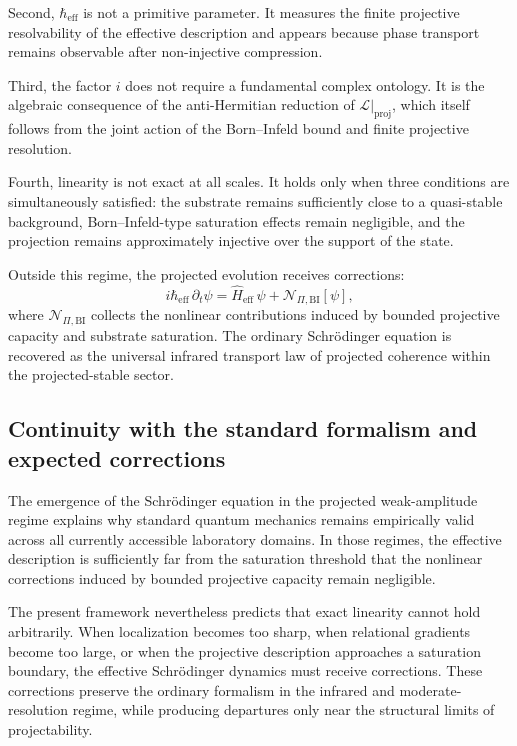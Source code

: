     Second, $\hbar_{\mathrm{eff}}$ is not a primitive parameter.
    It measures the finite projective resolvability of the effective description and appears
    because phase transport remains observable after non-injective compression.

    Third, the factor $i$ does not require a fundamental complex ontology.
    It is the algebraic consequence of the anti-Hermitian reduction of
    $\mathcal{L}|_{\mathrm{proj}}$, which itself follows from the joint action of the
    Born--Infeld bound and finite projective resolution.

    Fourth, linearity is not exact at all scales.
    It holds only when three conditions are simultaneously satisfied:
    the substrate remains sufficiently close to a quasi-stable background,
    Born--Infeld-type saturation effects remain negligible, and the projection remains
    approximately injective over the support of the state.

    Outside this regime, the projected evolution receives corrections:
    \[
      i\hbar_{\mathrm{eff}}\,\partial_t \psi
      = \hat{H}_{\mathrm{eff}}\,\psi
      + \mathcal{N}_{\Pi,\mathrm{BI}}[\psi],
    \]
    where $\mathcal{N}_{\Pi,\mathrm{BI}}$ collects the nonlinear contributions induced by bounded
    projective capacity and substrate saturation.
    The ordinary Schr\"{o}dinger equation is recovered as the universal infrared transport law
    of projected coherence within the projected-stable sector.

\subsection{Continuity with the standard formalism and expected corrections}
\label{subsec:schrodinger-corrections}

The emergence of the Schr\"{o}dinger equation in the projected weak-amplitude regime
explains why standard quantum mechanics remains empirically valid across all currently
accessible laboratory domains.
In those regimes, the effective description is sufficiently far from the saturation threshold
that the nonlinear corrections induced by bounded projective capacity remain negligible.

The present framework nevertheless predicts that exact linearity cannot hold arbitrarily.
When localization becomes too sharp, when relational gradients become too large, or when
the projective description approaches a saturation boundary, the effective Schr\"{o}dinger
dynamics must receive corrections.
These corrections preserve the ordinary formalism in the infrared and moderate-resolution
regime, while producing departures only near the structural limits of projectability.


